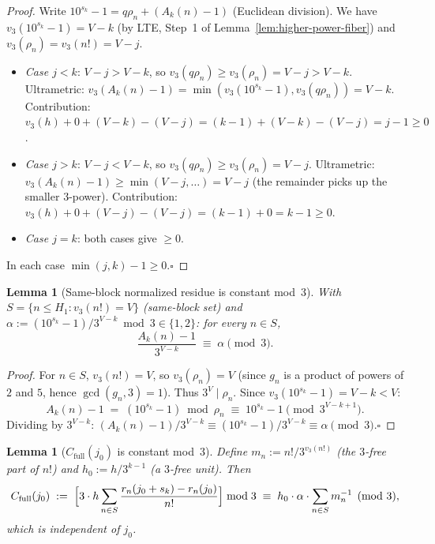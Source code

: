 \documentclass[
]{article}
\newtheorem{lemma}[theorem]{Lemma}
\begin{document}
\begin{proof}
Write $10^{s_k}-1=q\rho_n+(A_k(n)-1)$ (Euclidean division).
We have $v_3(10^{s_k}-1)=V-k$ (by LTE, Step~1 of Lemma~\ref{lem:higher-power-fiber})
and $v_3(\rho_n)=v_3(n!)=V-j$.
\begin{itemize}
\item \emph{Case $j<k$}: $V-j>V-k$, so $v_3(q\rho_n)\ge v_3(\rho_n)=V-j>V-k$.
  Ultrametric: $v_3(A_k(n)-1)=\min(v_3(10^{s_k}-1),v_3(q\rho_n))=V-k$.
  Contribution: $v_3(h)+0+(V-k)-(V-j)=(k-1)+(V-k)-(V-j)=j-1\ge 0$.
\item \emph{Case $j>k$}: $V-j<V-k$, so $v_3(q\rho_n)\ge v_3(\rho_n)=V-j$.
  Ultrametric: $v_3(A_k(n)-1)\ge\min(V-j,\ldots)=V-j$ (the remainder picks up the
  smaller $3$-power).
  Contribution: $v_3(h)+0+(V-j)-(V-j)=(k-1)+0=k-1\ge 0$.
\item \emph{Case $j=k$}: both cases give $\ge 0$.
\end{itemize}
In each case $\min(j,k)-1\ge 0$.\hfill$\square$
\end{proof}

\begin{lemma}[Same-block normalized residue is constant mod~$3$]\label{lem:alpha-const}
With $S=\{n\le H_1:v_3(n!)=V\}$ (same-block set) and
$\alpha:=(10^{s_k}-1)/3^{V-k}\bmod 3\in\{1,2\}$:
for every $n\in S$,
\[
  \frac{A_k(n)-1}{3^{V-k}}\;\equiv\;\alpha\pmod{3}.
\]
\end{lemma}

\begin{proof}
For $n\in S$, $v_3(n!)=V$, so $v_3(\rho_n)=V$ (since $g_n$ is a product of
powers of $2$ and $5$, hence $\gcd(g_n,3)=1$).
Thus $3^V\mid\rho_n$.  Since $v_3(10^{s_k}-1)=V-k<V$:
\[
  A_k(n)-1\;=\;(10^{s_k}-1)\bmod\rho_n\;\equiv\;10^{s_k}-1\pmod{3^{V-k+1}}.
\]
Dividing by $3^{V-k}$: $(A_k(n)-1)/3^{V-k}\equiv(10^{s_k}-1)/3^{V-k}\equiv\alpha\pmod 3$.\hfill$\square$
\end{proof}

\begin{lemma}[$C_{\mathrm{full}}(j_0)$ is constant mod~$3$]\label{lem:Cfull-const}
Define $m_n:=n!/3^{v_3(n!)}$ (the $3$-free part of $n!$) and
$h_0:=h/3^{k-1}$ (a $3$-free unit).  Then
\[
  C_{\mathrm{full}}(j_0)
  \;:=\;\Bigl[3\cdot h\sum_{n\in S}\frac{r_n(j_0+s_k)-r_n(j_0)}{n!}\Bigr]\bmod 3
  \;\equiv\; h_0\cdot\alpha\cdot\sum_{n\in S}m_n^{-1}\pmod{3},
\]
which is independent of $j_0$.
\end{lemma}
\end{document}
